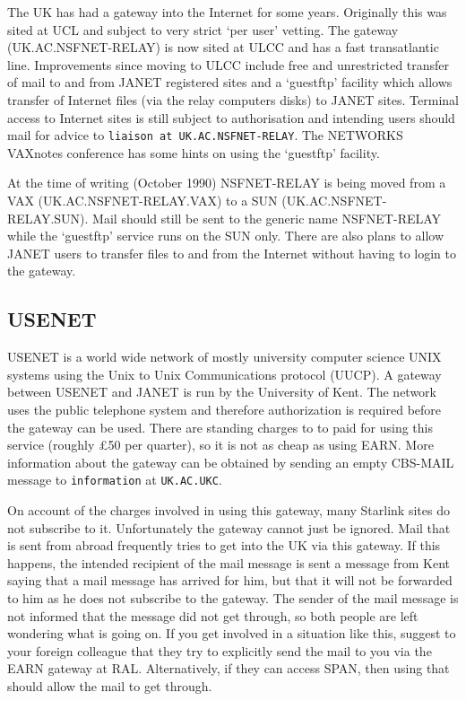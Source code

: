The UK has had a gateway into the Internet for some years. Originally this was
sited at UCL and subject to very strict `per user' vetting. The gateway
(UK.AC.NSFNET-RELAY) is now sited at ULCC and has a fast transatlantic line.
Improvements since moving to ULCC include free and unrestricted transfer of
mail to and from JANET registered sites and a `guestftp' facility which allows
transfer of Internet files (via the relay computers disks) to JANET sites.
Terminal access to Internet sites is still subject to authorisation and 
intending users should mail for advice to {\tt liaison at UK.AC.NSFNET-RELAY}. 
The NETWORKS VAXnotes conference has some hints on using the `guestftp'
facility.

At the time of writing (October 1990) NSFNET-RELAY is being moved from a VAX
(UK.AC.NSFNET-RELAY.VAX) to a SUN (UK.AC.NSFNET-RELAY.SUN). Mail should still
be sent to the generic name NSFNET-RELAY while the `guestftp' service runs on
the SUN only. There are also plans to allow JANET users to transfer files to
and from the Internet without having to login to the gateway.

\subsection{USENET}

USENET is a world wide network of mostly university computer science UNIX
systems using the Unix to Unix Communications protocol (UUCP). A gateway
between USENET and JANET is run by the University of Kent. The network uses
the public telephone system and therefore authorization is required before
the gateway can be used. There are standing charges to to paid for using this
service (roughly \pounds 50 per quarter), so it is not as cheap as using EARN.
More information about the gateway can be obtained
by sending an empty CBS-MAIL message to {\tt information} at {\tt UK.AC.UKC}.

On account of the charges involved in using this gateway, many Starlink sites
do not subscribe to it. Unfortunately the gateway cannot just be ignored. Mail
that is sent from abroad frequently tries to get into the UK via this gateway.
If this happens, the intended recipient of the mail message is sent a message
from Kent saying that a mail message has arrived for him, but that it will not
be forwarded to him as he does not subscribe to the gateway. The sender of the
mail message is not informed that the message did not get through, so both
people are left wondering what is going on. If you get involved in a situation
like this, suggest to your foreign colleague that they try to explicitly send
the mail to you via the EARN gateway at RAL. Alternatively, if they can access
SPAN, then using that should allow the mail to get through.

